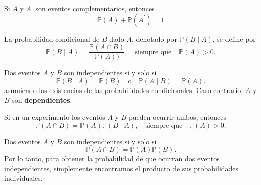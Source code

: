 \begin{theorem}[]
Si $A$ y $A^{\prime}$ son eventos complementarios, entonces
\begin{equation*}
\mathds{P}\left(A\right)+\mathds{P}\left(A^{\prime}\right)=1
\end{equation*}
\end{theorem}

\begin{definition}
La probabilidad condicional de $B$ dado $A$, denotado por $\mathds{P}\left(B\mid A\right)$, se define por
\begin{equation*}
\mathds{P}\left(B\mid A\right)=\frac{\mathds{P}\left(A\cap B\right)}{\mathds{P}\left(A\right))},\quad\text{siempre que}\quad \mathds{P}\left(A\right)>0.
\end{equation*}
\end{definition}

\begin{definition}[]
Dos eventos $A$ y $B$ son independientes si y solo si
\begin{equation*}
\mathds{P}\left(B\mid A\right)=\mathds{P}\left(B\right)\quad\text{o}\quad\mathds{P}\left(A\mid B\right)=\mathds{P}\left(A\right).
\end{equation*}
asumiendo las existencias de las probabilidades condicionales. Caso contrario, $A$ y $B$ son \textbf{dependientes}.
\end{definition}

\begin{theorem}[]
Si en un experimento los eventos $A$ y $B$ pueden ocurrir ambos, entonces
\begin{equation*}
\mathds{P}\left(A\cap B\right)=\mathds{P}\left(A\right)\mathds{P}\left(B\mid A\right),\quad\text{siempre que}\quad\mathds{P}\left(A\right)>0.
\end{equation*}
\end{theorem}

\begin{theorem}[]
Dos eventos $A$ y $B$ son independientes si y solo si
\begin{equation*}
\mathds{P}\left(A\cap B\right)=\mathds{P}\left(A\right)\mathds{P}\left(B\right).
\end{equation*}
Por lo tanto, para obtener la probabilidad de que ocurran dos eventos independientes, simplemente encontramos el producto de sus probabilidades individuales.
\end{theorem}

